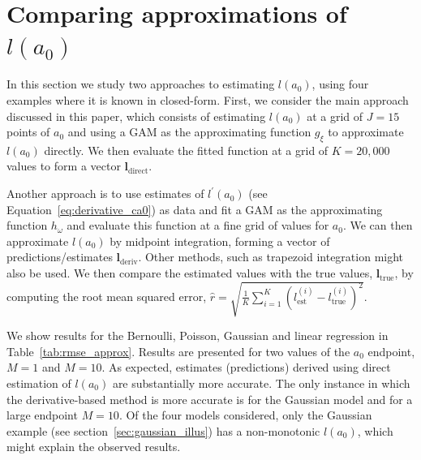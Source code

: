 \documentclass[a4paper, notitlepage, 11pt]{article}
\begin{document}
\section{Comparing approximations of $l(a_0)$}
\label{sec:derivative_only}

In this section we study two approaches to estimating $l(a_0)$, using four examples where it is known in closed-form.
First, we consider the main approach discussed in this paper, which consists of estimating $l(a_0)$ at a grid of $J = 15$ points of $a_0$ and using a GAM as the approximating function $g_\xi$ to approximate $l(a_0)$ directly.
We then evaluate the fitted function at a grid of $K = 20,000$ values to form a vector $\boldsymbol l_{\text{direct}}$.

Another approach is to use estimates of $l^\prime(a_0)$ (see Equation~\ref{eq:derivative_ca0}) as data and fit a GAM as the approximating function $h_\omega$ and evaluate this function at a fine grid of values for $a_0$.
We can then approximate $l(a_0)$ by midpoint integration, forming a vector of predictions/estimates $\boldsymbol l_{\text{deriv}}$.
Other methods, such as trapezoid integration might also be used.
We then compare the estimated values with the true values, $\boldsymbol l_{\text{true}}$, by computing the root mean squared error, $\hat{r} = \sqrt{\frac{1}{K} \sum_{i= 1}^K \left( l^{(i)}_{\text{est}} - l^{(i)}_{\text{true}} \right)^2 }$.

We show results for the Bernoulli, Poisson, Gaussian and linear regression in Table~\ref{tab:rmse_approx}.
Results are presented for two values of the $a_0$ endpoint, $M = 1$ and $M = 10$.
As expected, estimates (predictions) derived using direct estimation of $l(a_0)$ are substantially more accurate.
The only instance in which the derivative-based method is more accurate is for the Gaussian model and for a large endpoint $M = 10$.
Of the four models considered, only the Gaussian example (see section~\ref{sec:gaussian_illus}) has a non-monotonic $l(a_0)$, which might explain the observed results.
\end{document}

